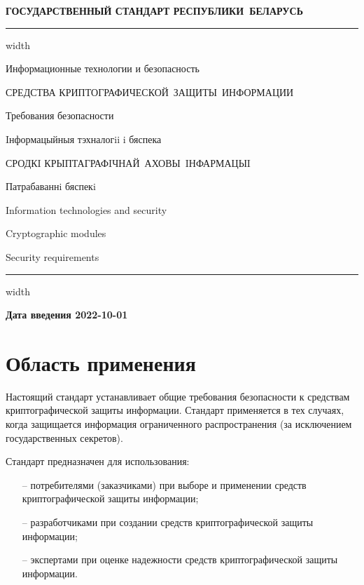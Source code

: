 \newpage
\setcounter{page}{1}
\pagestyle{headings}

\begin{center}
{\bfseries
ГОСУДАРСТВЕННЫЙ СТАНДАРТ РЕСПУБЛИКИ~БЕЛАРУСЬ
\vskip 2pt
\hrule width\textwidth

\vskip 9pt

Информационные технологии и безопасность

СРЕДСТВА КРИПТОГРАФИЧЕСКОЙ~ЗАЩИТЫ~ИНФОРМАЦИИ

Требования безопасности

\vskip 9pt

Iнформацыйныя тэхналогii i бяспека

СРОДКI КРЫПТАГРАФIЧНАЙ~АХОВЫ~IНФАРМАЦЫI

Патрабаваннi бяспекi
}

\vskip 9pt

Information technologies and security

Cryptographic modules

Security requirements

\vskip 4pt                
\hrule width \textwidth
\end{center}

\mbox{}\hfill{\bfseries Дата введения 2022-10-01}

\chapter{Область применения}\label{SCOPE}

Настоящий стандарт устанавливает общие требования безопасности к средствам
криптографической защиты информации. Стандарт применяется в тех 
случаях, когда защищается информация ограниченного распространения (за 
исключением государственных секретов).

Стандарт предназначен для использования:
\begin{itemize}
\item[--]
потребителями (заказчиками) при выборе и применении средств криптографической
защиты информации;

\item[--]
разработчиками при создании средств криптографической защиты информации;

\item[--]
экспертами при оценке надежности средств криптографической защиты 
информации. 
\end{itemize}


